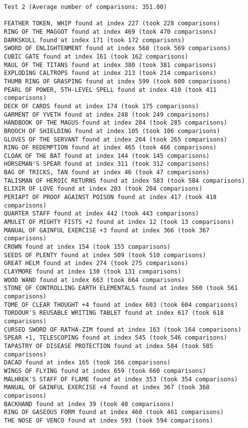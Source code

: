 \documentclass{article}
\begin{document}
\pagebreak

\begin{verbatim}
Test 2 (Average number of comparisons: 351.00)

FEATHER TOKEN, WHIP found at index 227 (took 228 comparisons)
RING OF THE MAGGOT found at index 469 (took 470 comparisons)
DARKSKULL found at index 171 (took 172 comparisons)
SWORD OF ENLIGHTENMENT found at index 568 (took 569 comparisons)
CUBIC GATE found at index 161 (took 162 comparisons)
MAUL OF THE TITANS found at index 380 (took 381 comparisons)
EXPLODING CALTROPS found at index 213 (took 214 comparisons)
THUMB RING OF GRASPING found at index 599 (took 600 comparisons)
PEARL OF POWER, 5TH-LEVEL SPELL found at index 410 (took 411 comparisons)
DECK OF CARDS found at index 174 (took 175 comparisons)
GARMENT OF YVETH found at index 248 (took 249 comparisons)
HANDBOOK OF THE MAGUS found at index 284 (took 285 comparisons)
BROOCH OF SHIELDING found at index 105 (took 106 comparisons)
GLOVES OF THE SERVANT found at index 264 (took 265 comparisons)
RING OF REDEMPTION found at index 465 (took 466 comparisons)
CLOAK OF THE BAT found at index 144 (took 145 comparisons)
HORSEMAN'S SPEAR found at index 311 (took 312 comparisons)
BAG OF TRICKS, TAN found at index 46 (took 47 comparisons)
TALISMAN OF HEROIC RETURNS found at index 583 (took 584 comparisons)
ELIXIR OF LOVE found at index 203 (took 204 comparisons)
PERIAPT OF PROOF AGAINST POISON found at index 417 (took 418 comparisons)
QUARTER STAFF found at index 442 (took 443 comparisons)
AMULET OF MIGHTY FISTS +2 found at index 12 (took 13 comparisons)
MANUAL OF GAINFUL EXERCISE +3 found at index 366 (took 367 comparisons)
CROWN found at index 154 (took 155 comparisons)
SEEDS OF PLENTY found at index 509 (took 510 comparisons)
GREAT HELM found at index 274 (took 275 comparisons)
CLAYMORE found at index 130 (took 131 comparisons)
WOOD WAND found at index 663 (took 664 comparisons)
STONE OF CONTROLLING EARTH ELEMENTALS found at index 560 (took 561 comparisons)
TOME OF CLEAR THOUGHT +4 found at index 603 (took 604 comparisons)
TORDOUR'S REUSABLE WRITING TABLET found at index 617 (took 618 comparisons)
CURSED SWORD OF RATHA-ZIM found at index 163 (took 164 comparisons)
SPEAR +1, TELESCOPING found at index 545 (took 546 comparisons)
TAPASTRY OF DISEASE PROTECTION found at index 584 (took 585 comparisons)
DACAD found at index 165 (took 166 comparisons)
WINGS OF FLYING found at index 659 (took 660 comparisons)
MALHREK'S STAFF OF FLAME found at index 353 (took 354 comparisons)
MANUAL OF GAINFUL EXERCISE +4 found at index 367 (took 368 comparisons)
BACKHAND found at index 39 (took 40 comparisons)
RING OF GASEOUS FORM found at index 460 (took 461 comparisons)
THE NOSE OF VENCO found at index 593 (took 594 comparisons)
\end{verbatim}
\end{document}
